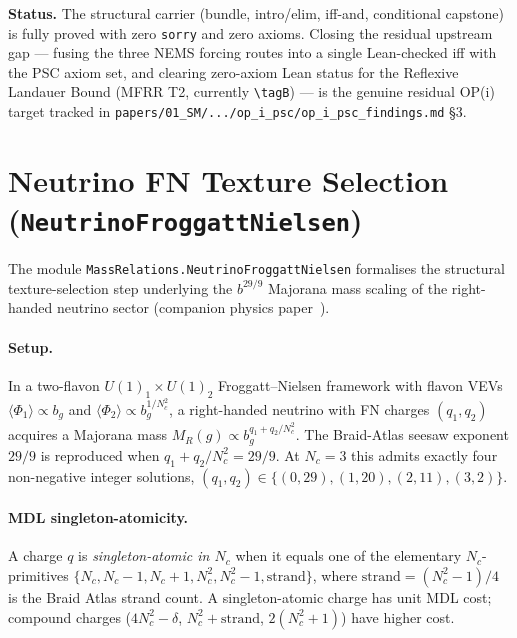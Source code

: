 \documentclass[11pt,a4paper]{article}
\theoremstyle{definition}
\begin{document}
\textbf{Status.}
The structural carrier (bundle, intro/elim, iff-and, conditional capstone) is
fully proved with zero \texttt{sorry} and zero axioms.  Closing the residual
upstream gap --- fusing the three NEMS forcing routes into a single Lean-checked
iff with the PSC axiom set, and clearing zero-axiom Lean status for the
Reflexive Landauer Bound (MFRR T2, currently \texttt{\textbackslash{}tagB}) ---
is the genuine residual OP(i) target tracked in
\texttt{papers/01\_SM/.../op\_i\_psc/op\_i\_psc\_findings.md} \S 3.

\section{Neutrino FN Texture Selection (\texttt{NeutrinoFroggattNielsen})}
\label{sec:neutrino_fn}

The module \texttt{MassRelations.NeutrinoFroggattNielsen}
formalises the structural texture-selection step underlying the
$b^{29/9}$ Majorana mass scaling of the right-handed neutrino sector
(companion physics paper~\cite{SpivackNeutrino2026}).

\paragraph{Setup.}
In a two-flavon $U(1)_1 \times U(1)_2$ Froggatt--Nielsen framework with
flavon VEVs $\langle\Phi_1\rangle\propto b_g$ and
$\langle\Phi_2\rangle\propto b_g^{1/N_c^2}$, a right-handed neutrino with
FN charges $(q_1, q_2)$ acquires a Majorana mass $M_R(g) \propto b_g^{q_1 + q_2/N_c^2}$.
The Braid-Atlas seesaw exponent $29/9$ is reproduced when
$q_1 + q_2/N_c^2 = 29/9$.  At $N_c = 3$ this admits exactly four
non-negative integer solutions, $(q_1, q_2) \in \{(0,29),(1,20),(2,11),(3,2)\}$.

\paragraph{MDL singleton-atomicity.}
A charge $q$ is \emph{singleton-atomic in $N_c$} when it equals one of the
elementary $N_c$-primitives $\{N_c, N_c-1, N_c+1, N_c^2, N_c^2-1, \mathrm{strand}\}$,
where $\mathrm{strand} = (N_c^2-1)/4$ is the Braid Atlas strand count.  A
singleton-atomic charge has unit MDL cost; compound charges
($4N_c^2 - \delta$, $N_c^2 + \mathrm{strand}$, $2(N_c^2+1)$) have higher cost.
\end{document}

